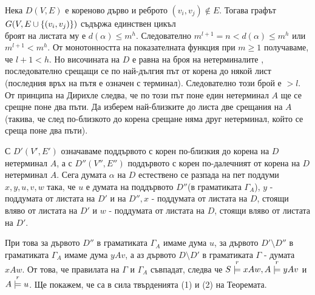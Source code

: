 \documentclass[11pt]{article}
\begin{document}
\theorem Нека $D(V, E)$ е кореново дърво и реброто $(v_{i}, v_{j}) \notin E$. Тогава графът $G(V, E \cup \{(v_{i}, v_{j})\})$  съдържа единствен цикъл \\

броят на листата му е $d(\alpha) \leq m^{h}$. Следователно $m^{l+1} = n < d(\alpha) \leq m^{h}$ или $m^{l+1} < m^{h}$. От монотонността на показателната функция при $m \geq 1$ получаваме, че $l + 1 < h$. Но височината на $D$ е равна на броя на нетерминалите , последователно срещащи се по най-дългия път от корена до някой лист (последния връх на пътя е означен с терминал). Следователно този брой е $> l$. От принципа на Дирихле следва, че по този път поне един нетерминал $A$ ще се срещне поне два пъти. Да изберем най-близките до листа две срещания на $A$ (такива, че след по-близкото до корена срещане няма друг нетерминал, който се среща поне два пъти). 

С $D'(V', E')$ означаваме поддървото с корен по-близкия до корена на $D$ нетерминал $A$, а с $D''(V'', E'')$ поддървото с корен по-далечният от корена на $D$ нетерминал $A$. Сега думата $\alpha$ на $D$ естествено се разпада на пет поддуми $x, y, u, v, w$ така, че $u$ е думата на поддървото $D''$(в граматиката $\Gamma_{A}$), $y$ - поддумата от листата на $D'$ и на $D'', x$ - поддумата от листата на $D$, стоящи вляво от листата на $D'$ и $w$ - поддумата от листата на $D$, стоящи вляво от листата на $D'$. \par 

При това за дървото $D''$ в граматиката $\Gamma_{A}$ имаме дума $u$, за дървото $D'\setminus D''$ в граматиката $\Gamma_{A}$ имаме дума $yAv$, а аз дървото $D \setminus D'$ в граматиката $\Gamma$ - думата $xAw$. От това, че правилата на $\Gamma$ и $\Gamma_{A}$ съвпадат, следва че $S\overset{r}{\models} xAw, A \overset{r}{\models} yAv$ и $A \overset{r}{\models} u$. Ще покажем, че са в сила твърденията (1) и (2) на Теоремата.
\end{document}
